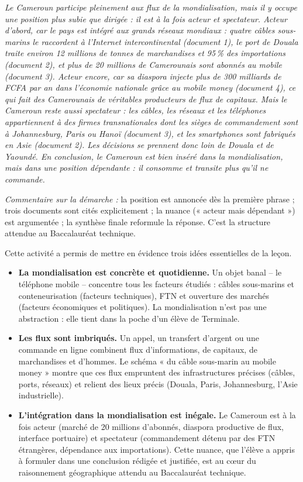 \documentclass[11pt]{article}
\newcounter{popsec}
\newcounter{popsub}
\newcommand{\courssub}[1]{%
  \stepcounter{popsub}%
  \par\vspace{9pt}\noindent{\popxbold\fontsize{11.5}{13}\selectfont\color{popink}{\color{poporange}\thepopsec.\thepopsub}\hspace{6pt}#1}\par\nopagebreak\vspace{4pt}
}
\begin{document}
\begin{exoresolu}
\emph{Le Cameroun participe pleinement aux flux de la mondialisation, mais il y occupe une position plus subie que dirigée : il est à la fois acteur et spectateur. Acteur d'abord, car le pays est intégré aux grands réseaux mondiaux : quatre câbles sous-marins le raccordent à l'Internet intercontinental (document 1), le port de Douala traite environ 12 millions de tonnes de marchandises et 95\,\% des importations (document 2), et plus de 20 millions de Camerounais sont abonnés au mobile (document 3). Acteur encore, car sa diaspora injecte plus de 300 milliards de FCFA par an dans l'économie nationale grâce au mobile money (document 4), ce qui fait des Camerounais de véritables producteurs de flux de capitaux. Mais le Cameroun reste aussi spectateur : les câbles, les réseaux et les téléphones appartiennent à des firmes transnationales dont les sièges de commandement sont à Johannesburg, Paris ou Hanoï (document 3), et les smartphones sont fabriqués en Asie (document 2). Les décisions se prennent donc loin de Douala et de Yaoundé. En conclusion, le Cameroun est bien inséré dans la mondialisation, mais dans une position dépendante : il consomme et transite plus qu'il ne commande.}

\emph{Commentaire sur la démarche :} la position est annoncée dès la première phrase ; trois documents sont cités explicitement ; la nuance (« acteur mais dépendant ») est argumentée ; la synthèse finale reformule la réponse. C'est la structure attendue au Baccalauréat technique.
\end{exoresolu}

\courssub{Bilan de l'activité}

Cette activité a permis de mettre en évidence trois idées essentielles de la leçon.

\begin{itemize}
\item \textbf{La mondialisation est concrète et quotidienne.} Un objet banal -- le téléphone mobile -- concentre tous les facteurs étudiés : câbles sous-marins et conteneurisation (facteurs techniques), FTN et ouverture des marchés (facteurs économiques et politiques). La mondialisation n'est pas une abstraction : elle tient dans la poche d'un élève de Terminale.
\item \textbf{Les flux sont imbriqués.} Un appel, un transfert d'argent ou une commande en ligne combinent flux d'informations, de capitaux, de marchandises et d'hommes. Le schéma « du câble sous-marin au mobile money » montre que ces flux empruntent des infrastructures précises (câbles, ports, réseaux) et relient des lieux précis (Douala, Paris, Johannesburg, l'Asie industrielle).
\item \textbf{L'intégration dans la mondialisation est inégale.} Le Cameroun est à la fois acteur (marché de 20 millions d'abonnés, diaspora productive de flux, interface portuaire) et spectateur (commandement détenu par des FTN étrangères, dépendance aux importations). Cette nuance, que l'élève a appris à formuler dans une conclusion rédigée et justifiée, est au cœur du raisonnement géographique attendu au Baccalauréat technique.
\end{itemize}
\end{document}
